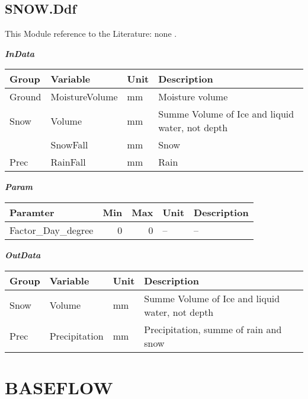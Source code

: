 \documentclass[
]{book}
\begin{document}
\hypertarget{snow.ddf}{%
\subsection{SNOW.Ddf}\label{snow.ddf}}

This Module reference to the Literature: none \citep{none}.

\textbf{\emph{InData}}

\begin{table}[!h]
\centering
\begin{tabular}{l|l|l|l}
\hline
Group & Variable & Unit & Description\\
\hline
Ground & MoistureVolume & mm & Moisture volume\\
\cline{1-4}
Snow & Volume & mm & Summe Volume of Ice and liquid water, not depth\\
\cline{1-4}
 & SnowFall & mm & Snow\\
\cline{2-4}
\multirow{-2}{*}{\raggedright\arraybackslash Prec} & RainFall & mm & Rain\\
\hline
\end{tabular}
\end{table}

\textbf{\emph{Param}}

\begin{table}[!h]
\centering
\begin{tabular}{l|r|r|l|l}
\hline
Paramter & Min & Max & Unit & Description\\
\hline
Factor\_Day\_degree & 0 & 0 & -- & --\\
\hline
\end{tabular}
\end{table}

\textbf{\emph{OutData}}

\begin{table}[!h]
\centering
\begin{tabular}{l|l|l|l}
\hline
Group & Variable & Unit & Description\\
\hline
Snow & Volume & mm & Summe Volume of Ice and liquid water, not depth\\
\cline{1-4}
Prec & Precipitation & mm & Precipitation, summe of rain and snow\\
\hline
\end{tabular}
\end{table}

\hypertarget{baseflow}{%
\section{BASEFLOW}\label{baseflow}}
\end{document}
